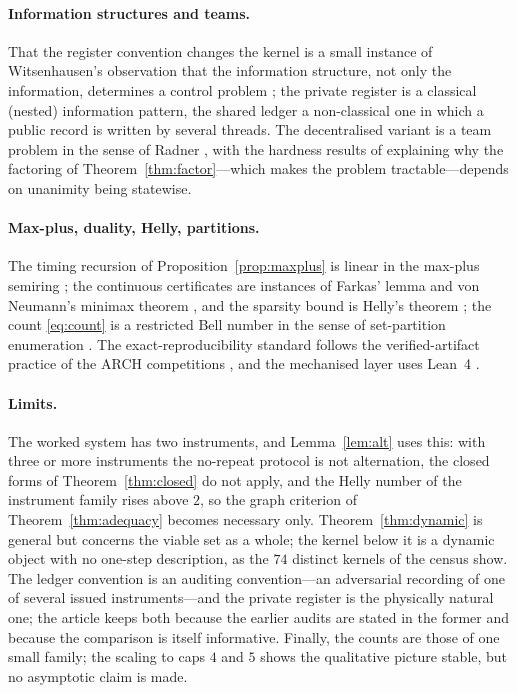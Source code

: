 \paragraph{Information structures and teams.}
That the register convention changes the kernel is a small instance of Witsenhausen's observation that the information structure, not only the information, determines a control problem \cite{Witsenhausen1971,Ho1980}; the private register is a classical (nested) information pattern, the shared ledger a non-classical one in which a public record is written by several threads. The decentralised variant is a team problem in the sense of Radner \cite{Radner1962}, with the hardness results of \cite{TsitsiklisAthans1985,Bernstein2002} explaining why the factoring of Theorem~\ref{thm:factor}---which makes the problem tractable---depends on unanimity being statewise.

\paragraph{Max-plus, duality, Helly, partitions.}
The timing recursion of Proposition~\ref{prop:maxplus} is linear in the max-plus semiring \cite{Baccelli1992,Heidergott2006}; the continuous certificates are instances of Farkas' lemma and von Neumann's minimax theorem \cite{Farkas1902,vonNeumann1928}, and the sparsity bound is Helly's theorem \cite{Helly1923,DanzerGrunbaumKlee1963}; the count \eqref{eq:count} is a restricted Bell number in the sense of set-partition enumeration \cite{Stanley2012}. The exact-reproducibility standard follows the verified-artifact practice of the ARCH competitions \cite{Althoff2020,Geretti2020}, and the mechanised layer uses Lean~4 \cite{MouraUllrich2021}.

\paragraph{Limits.}
The worked system has two instruments, and Lemma~\ref{lem:alt} uses this: with three or more instruments the no-repeat protocol is not alternation, the closed forms of Theorem~\ref{thm:closed} do not apply, and the Helly number of the instrument family rises above $2$, so the graph criterion of Theorem~\ref{thm:adequacy} becomes necessary only. Theorem~\ref{thm:dynamic} is general but concerns the viable set as a whole; the kernel below it is a dynamic object with no one-step description, as the $74$ distinct kernels of the census show. The ledger convention is an auditing convention---an adversarial recording of one of several issued instruments---and the private register is the physically natural one; the article keeps both because the earlier audits are stated in the former and because the comparison is itself informative. Finally, the counts are those of one small family; the scaling to caps $4$ and $5$ shows the qualitative picture stable, but no asymptotic claim is made.
